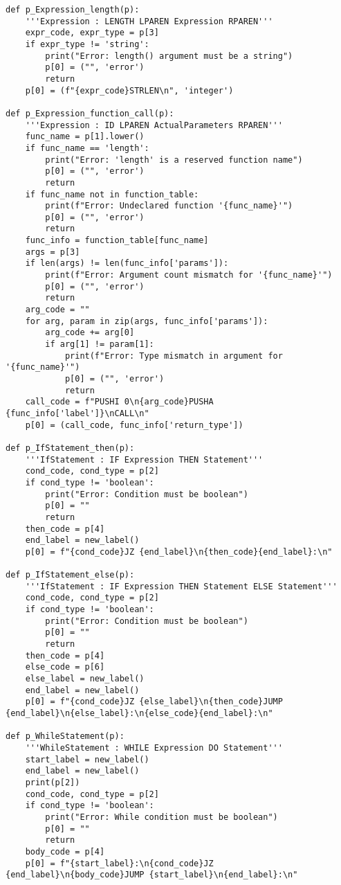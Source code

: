\documentclass[12pt,a4paper]{report}%
\begin{document}
\begin{lstlisting}[style=pythonStyle, caption={Ficheiro lex.py}]
def p_Expression_length(p):
    '''Expression : LENGTH LPAREN Expression RPAREN'''
    expr_code, expr_type = p[3]
    if expr_type != 'string':
        print("Error: length() argument must be a string")
        p[0] = ("", 'error')
        return
    p[0] = (f"{expr_code}STRLEN\n", 'integer')

def p_Expression_function_call(p):
    '''Expression : ID LPAREN ActualParameters RPAREN'''
    func_name = p[1].lower()
    if func_name == 'length':
        print("Error: 'length' is a reserved function name")
        p[0] = ("", 'error')
        return
    if func_name not in function_table:
        print(f"Error: Undeclared function '{func_name}'")
        p[0] = ("", 'error')
        return
    func_info = function_table[func_name]
    args = p[3]
    if len(args) != len(func_info['params']):
        print(f"Error: Argument count mismatch for '{func_name}'")
        p[0] = ("", 'error')
        return
    arg_code = ""
    for arg, param in zip(args, func_info['params']):
        arg_code += arg[0]
        if arg[1] != param[1]:
            print(f"Error: Type mismatch in argument for '{func_name}'")
            p[0] = ("", 'error')
            return
    call_code = f"PUSHI 0\n{arg_code}PUSHA {func_info['label']}\nCALL\n"
    p[0] = (call_code, func_info['return_type'])

def p_IfStatement_then(p):
    '''IfStatement : IF Expression THEN Statement'''
    cond_code, cond_type = p[2]
    if cond_type != 'boolean':
        print("Error: Condition must be boolean")
        p[0] = ""
        return
    then_code = p[4]
    end_label = new_label()
    p[0] = f"{cond_code}JZ {end_label}\n{then_code}{end_label}:\n"

def p_IfStatement_else(p):
    '''IfStatement : IF Expression THEN Statement ELSE Statement'''
    cond_code, cond_type = p[2]
    if cond_type != 'boolean':
        print("Error: Condition must be boolean")
        p[0] = ""
        return
    then_code = p[4]
    else_code = p[6]
    else_label = new_label()
    end_label = new_label()
    p[0] = f"{cond_code}JZ {else_label}\n{then_code}JUMP {end_label}\n{else_label}:\n{else_code}{end_label}:\n"

def p_WhileStatement(p):
    '''WhileStatement : WHILE Expression DO Statement'''
    start_label = new_label()
    end_label = new_label()
    print(p[2])
    cond_code, cond_type = p[2]
    if cond_type != 'boolean':
        print("Error: While condition must be boolean")
        p[0] = ""
        return
    body_code = p[4]
    p[0] = f"{start_label}:\n{cond_code}JZ {end_label}\n{body_code}JUMP {start_label}\n{end_label}:\n"


\end{lstlisting}
\end{document}
